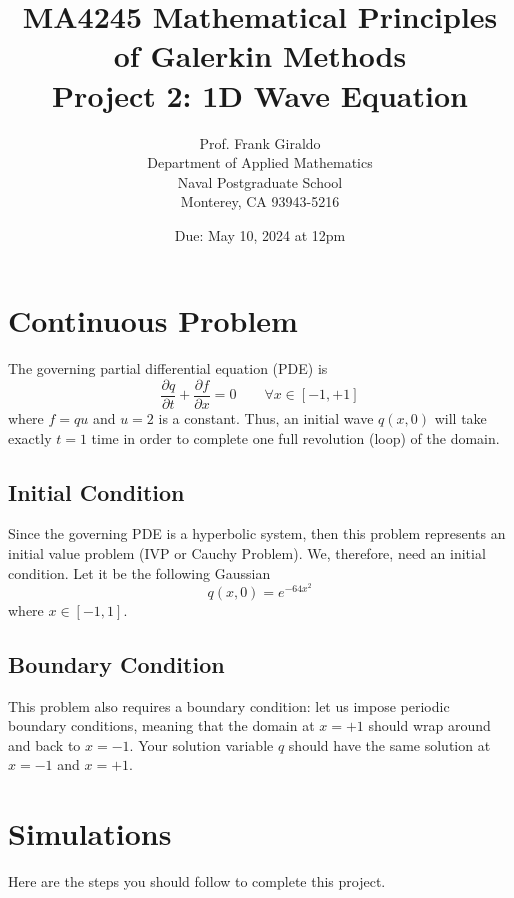 \documentclass[10pt]{article}
\newcommand{\diff}[2] {\frac{\partial #1}{\partial #2}}
\begin{document}
\title{MA4245 Mathematical Principles of Galerkin Methods \\
Project 2: 1D Wave Equation}
\author{Prof. Frank Giraldo \\
Department of Applied Mathematics \\
Naval Postgraduate School \\
Monterey, CA 93943-5216}
\date{Due: May 10, 2024 at 12pm}
\maketitle

\section{Continuous Problem}
The governing partial differential equation (PDE) is
\[
\diff{q}{t} + \diff{f}{x} = 0 \qquad \forall x \in [-1,+1]
\]
where $f=qu$ and $u=2$ is a constant. Thus, an initial wave $q(x,0)$ will take exactly $t=1$ time in order to 
complete one full revolution (loop) of the domain. 

\subsection{Initial Condition}
Since the governing PDE is a hyperbolic system, then this problem represents an initial value problem (IVP or Cauchy Problem).  We, therefore, need 
an initial condition. 
Let it be the following Gaussian
\[
q(x,0)=e^{ - 64 x^2 }
\]
where $x \in [-1,1]$.

\subsection{Boundary Condition}
This problem also requires a boundary condition: let us impose periodic boundary conditions, meaning that the domain at $x=+1$ should wrap around 
and back to $x=-1$. Your solution variable $q$ should have the same solution at $x=-1$ and $x=+1$.

\section{Simulations}

Here are the steps you should follow to complete this project.
\end{document}
